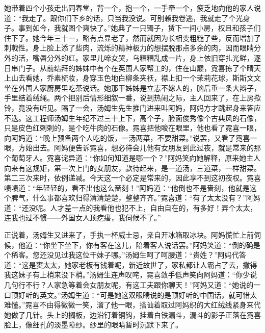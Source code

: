 \par 她带着四个小孩走出同春堂，背一个，抱一个，一手牵一个，疲乏地向他的家人说道：“我走了。跟你们下乡的话，只当我没说。可别赖我卷逃，我就走了个光身子。事到如今，我就图个爽快了。”她典了一只镯子，赁下一间小房，权且和孩子们住下了。她今年三十一，略有点显老了，然而就因为长相变粗糙了些，反而增加了刺戟性。身上脸上添了些肉，流烁的精神极力的想摆脱那点多余的肉，因而眼睛分外的活，嘴唇分外的红。家里儿啼女哭，乌糟糟乱成一片，身上依旧穿扎光鲜，逐日串门子。从前结拜的姊妹中有个在英国人家帮工的，住在山巅，霓喜拣了个晴天上山去看她，乔素梳妆，身穿玉色地白柳条夹袄，襟上扣一个茉莉花球，斯斯文文坐在外国人家厨房里吃茶说话。她那干姊姊是立志不嫁人的，脑后垂一条大辫子，手里结着绒绳。两个把别后情形细叙一番，说到热闹之际，主人回来了，在上房揿铃，竟没有听见。隔了一会，汤姆生先生推门进来叫阿妈，阿妈方才跳起身来答应不迭。这工程师汤姆生年纪不过三十上下，高个子，脸面俊秀像个古典风的石像，只是皮色红剌剌的，是个吃牛肉的石像。霓喜把他睃在眼里，他也看了霓喜一眼，向阿妈道：“晚上预备两个人吃的饭，一汤两菜，不要甜菜。”说罢，又看了霓喜一眼，方始出去。阿妈便告诉霓喜，想必待会儿他有女朋友到此过夜，就是常来的那个葡萄牙人。霓喜诧异道：“你如何知道是哪一个？”阿妈笑向她解释，原来她主人向来有这规矩，第一次上门的女朋友，款待起来，是一道汤，三道菜，一样甜菜。第二三次来时，依例递减。今天这一个必定是常来的，因此享不到这初夜权。霓喜啧啧道：“年轻轻的，看不出他这么啬刻！”阿妈道：“他倒也不是啬刻，他就是这个脾气，什么事都喜欢归得清清楚楚，整整齐齐。”霓喜道：“有了太太没有？”阿妈道：“还没呢。人才差一点的我看他也犯不上，自由自在的，有多好！弄个太太，连我也过不惯——外国女人顶疙瘩，我伺候不了。”
\par 正说着，汤姆生又进来了，手执一杯威士忌，亲自开冰箱取冰块。阿妈慌忙上前伺候，他道：“你坐下坐下，你有客在这儿，陪着客人说话罢。”阿妈笑道：“倒的确是个稀客。您还没见过我这位干妹子哪。”汤姆生呵了呵腰道：“贵姓？”阿妈代答道：“这是窦太太，她家老板有钱着呢，新近故世了，家私都让人霸占了去，撇得我这妹子有上梢来没下梢。”汤姆生连声叹咤，霓喜敛手低声笑向阿妈道：“你少说几句行不行？人家急等着会女朋友呢，有这工夫跟你聊天！”阿妈又道：“她说的一口顶好听的英文。”汤姆生道：“可是她这双眼睛说的是顶好听的中国话，就可惜太难懂。”霓喜不由得微微一笑，溜了他一眼，搭讪着取过阿妈织的大红绒线紧身来代她做了几针。头上的搁板，边沿钉着铜钩，挂着白铁漏斗，漏斗的影子正落在霓喜脸上，像细孔的淡墨障纱。纱里的眼睛暂时沉默下来了。
